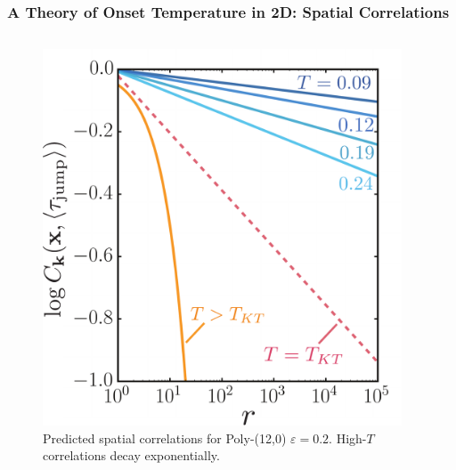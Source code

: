 \begin{frame}[c]
\frametitle{A Theory of Onset Temperature in 2D: Spatial Correlations} %

\begin{columns}[T]

\begin{column}[T]{0.45\linewidth}

\begin{figure}[t]
\begin{overprint}
    \centering\includegraphics[height=0.75\textheight]{c.15-kt_spatialcorrel/spatialcorrel.pdf}\caption{Predicted spatial correlations for Poly-(12,0) $\varepsilon=0.2$. High-$T$ correlations decay exponentially.}
\end{overprint}
\end{figure}

\end{column}

\begin{column}{0.55\linewidth}


\end{column}
\end{columns}
\end{frame}
